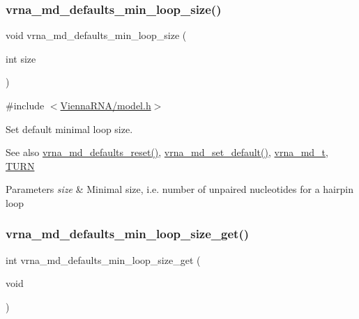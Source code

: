 \subsubsection{\texorpdfstring{vrna\+\_\+md\+\_\+defaults\+\_\+min\+\_\+loop\+\_\+size()}{vrna\_md\_defaults\_min\_loop\_size()}}
{\footnotesize\ttfamily void vrna\+\_\+md\+\_\+defaults\+\_\+min\+\_\+loop\+\_\+size (\begin{DoxyParamCaption}\item[{int}]{size }\end{DoxyParamCaption})}



{\ttfamily \#include $<$\hyperlink{model_8h}{Vienna\+R\+N\+A/model.\+h}$>$}



Set default minimal loop size. 

\begin{DoxySeeAlso}{See also}
\hyperlink{group__model__details_ga70834424cf804d149937de89f80ceb45}{vrna\+\_\+md\+\_\+defaults\+\_\+reset()}, \hyperlink{group__model__details_ga8ac6ff84936282436f822644bf841f66}{vrna\+\_\+md\+\_\+set\+\_\+default()}, \hyperlink{group__model__details_ga1f8a10e12a0a1915f2a4eff0b28ea17c}{vrna\+\_\+md\+\_\+t}, \hyperlink{constants_8h_ae646250fd59311356c7e5722a81c3a96}{T\+U\+RN} 
\end{DoxySeeAlso}

\begin{DoxyParams}{Parameters}
{\em size} & Minimal size, i.\+e. number of unpaired nucleotides for a hairpin loop \\
\hline
\end{DoxyParams}
\mbox{\label{group__model__details_ga5cc691174a75c652807dc361b617632a}} 
\subsubsection{\texorpdfstring{vrna\+\_\+md\+\_\+defaults\+\_\+min\+\_\+loop\+\_\+size\+\_\+get()}{vrna\_md\_defaults\_min\_loop\_size\_get()}}
{\footnotesize\ttfamily int vrna\+\_\+md\+\_\+defaults\+\_\+min\+\_\+loop\+\_\+size\+\_\+get (\begin{DoxyParamCaption}\item[{void}]{ }\end{DoxyParamCaption})}



